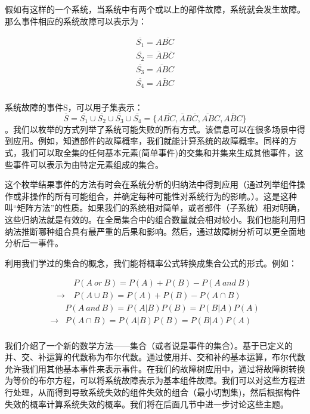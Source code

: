 \documentclass[cn,11pt,chinese]{elegantbook}
\begin{document}
假如有这样的一个系统，当系统中有两个或以上的部件故障，系统就会发生故障。那么事件相应的系统故障可以表示为：


\begin{align*}
\overline{S_1}=A\overline{BC} \\
\overline{S_2}=\overline{A}B\overline{C}    \\
\overline{S_3}=\overline{AB}C \\
\overline{S_4}=\overline{ABC}   \\
\end{align*}

系统故障的事件S，可以用子集表示：$$\overline{S}=\overline{S_1}\cup \overline{S_2} \cup \overline{S_3} \cup \overline{S_4} = \{A\overline{BC},\overline{A} B \overline{C},\overline{AB}C,\overline{ABC}\}$$。我们以枚举的方式列举了系统可能失败的所有方式。该信息可以在很多场景中得到应用。例如，知道部件的故障概率，我们就能计算系统的故障概率。同样的方式，我们可以取全集的任何基本元素(简单事件)的交集和并集来生成其他事件，这些事件可以表示为由特定元素组成的集合。

这个枚举结果事件的方法有时会在系统分析的归纳法中得到应用（通过列举组件操作或非操作的所有可能组合，并确定每种可能性对系统行为的影响。）。这是这种叫“矩阵方法”的性质。如果我们的系统相对简单，或者部件（子系统）相对明确，这些归纳法就是有效的。在全局集合中的组合数量就会相对较小。我们也能利用归纳法推断哪种组合具有最严重的后果和影响。然后，通过故障树分析可以更全面地分析后一事件。

利用我们学过的集合的概念，我们能将概率公式转换成集合公式的形式。例如：

 \begin{equation} \begin{split}&P(A \ or \ B)=P(A)+P(B)-P(A \ and \ B) \ \\  \to \ &P(A \cup B) = P(A)+P(B)-P(A\cap B) \end{split} \end{equation}
 \begin{equation}
 \begin{split}
 	&P(A \ and\  B)=P(A|B)P(B)=P(B|A)P(A) \\
 	\to &P(A \cap B)=P(A|B)P(B)=P(B|A)P(A) \\
 \end{split}
 \end{equation}
 
 
 我们介绍了一个新的数学方法——集合（或者说是事件的集合）。基于已定义的并、交、补运算的代数称为布尔代数。通过使用并、交和补的基本运算，布尔代数允许我们用其他基本事件来表示事件。在我们的故障树应用中，通过将故障树转换为等价的布尔方程，可以将系统故障表示为基本组件故障。我们可以对这些方程进行处理，从而得到导致系统失效的组件失效的组合（最小切割集)，然后根据构件失效的概率计算系统失效的概率。我们将在后面几节中进一步讨论这些主题。
 
\end{document}
